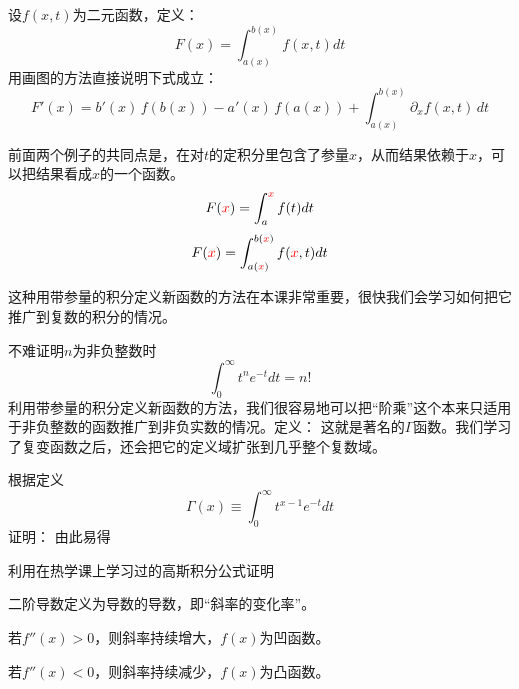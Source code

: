 \documentclass[CJK]{beamer}
\begin{document}
\begin{frame}
  \bch
  
  设$f(x,t)$为二元函数，定义：
  $$ F(x) = \int_{a(x)}^{b(x)} f(x, t) dt $$
  用画图的方法直接说明下式成立：
  $$ F'(x) =b'(x)\,f\left(b(x)\right)- a'(x)\,f\left(a(x)\right) + \int_{a(x)}^{b(x)} \partial_x f(x, t)\, dt $$

  \ech
\end{frame}

\begin{frame}
  \bch
  前面两个例子的共同点是，在对$t$的定积分里包含了参量$x$，从而结果依赖于$x$，可以把结果看成$x$的一个函数。
  $$ F({\color{red} x}) = \int_a^{{\color{red} x}} f(t) dt$$
  $$ F({\color{red} x}) = \int_{a({\color{red} x})}^{b({\color{red} x})} f({\color{red} x}, t) dt $$  
  \skiplines
  
  这种用带参量的积分定义新函数的方法在本课非常重要，很快我们会学习如何把它推广到复数的积分的情况。

  
  \ech
\end{frame}

\begin{frame}
  \bch
  不难证明$n$为非负整数时
  $$\int_0^\infty t^n e^{-t}dt = n!$$
  利用带参量的积分定义新函数的方法，我们很容易地可以把“阶乘”这个本来只适用于非负整数的函数推广到非负实数的情况。定义：
  这就是著名的$\Gamma$函数。我们学习了复变函数之后，还会把它的定义域扩张到几乎整个复数域。
  \ech
\end{frame}


\begin{frame}
  \bch
  根据定义
  $$\Gamma\left(x\right) \equiv \int_0^\infty t^{x-1}e^{-t} dt $$
  证明：
  由此易得

\ech
\end{frame}

\begin{frame}
  \bch
  利用在热学课上学习过的高斯积分公式证明
  \ech
\end{frame}


\begin{frame}
\bch
二阶导数定义为导数的导数，即“斜率的变化率”。

若$f''(x)>0$，则斜率持续增大，$f(x)$为凹函数。

若$f''(x)<0$，则斜率持续减少，$f(x)$为凸函数。


\ech
\end{frame}
\end{document}

